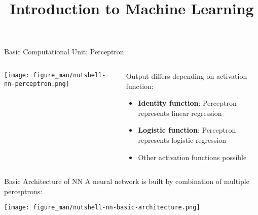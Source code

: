 \documentclass[11pt,compress,t,notes=noshow, xcolor=table]{beamer}
\title{Introduction to Machine Learning}
\begin{document}

\sloppy

\begin{vbframe}{Basic Computational Unit: Perceptron}


\begin{columns}
\begin{column}{0.6\textwidth}
\begin{center}
\texttt{[image: figure\_man/nutshell-nn-perceptron.png]}
\end{center}
\end{column}
\begin{column}{0.4\textwidth}
\begin{center}
\small Output differs depending on activation function:
\begin{itemize}
    \small \item \textbf{Identity function}: Perceptron represents linear regression
    \small \item \textbf{Logistic function}:  Perceptron represents logistic regression
    \small \item Other activation functions possible
\end{itemize}
\end{center}
\end{column}
\end{columns}
\end{vbframe}

\begin{vbframe}{Basic Architecture of NN}
\small A neural network is built by combination of multiple perceptrons:

\vspace{0.5cm}
\texttt{[image: figure\_man/nutshell-nn-basic-architecture.png]}    
\end{vbframe}
\end{document}
